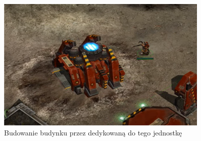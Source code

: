 \begin{figure}[h!]
    \centering
    \includegraphics[width=0.9\textwidth]{images/warhammer.png}
    \caption{Budowanie budynku przez dedykowaną do tego jednostkę}
\end{figure}